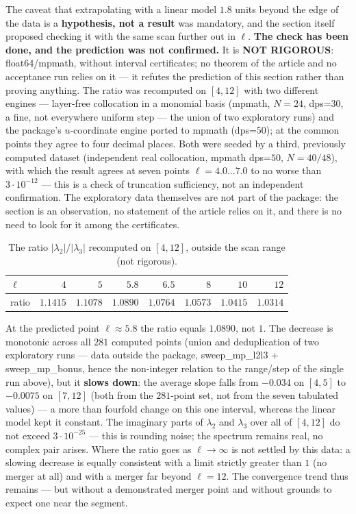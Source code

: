 The caveat that extrapolating with a linear model $1.8$ units beyond the edge
of the data is a \textbf{hypothesis, not a result} was mandatory, and the section
itself proposed checking it with the same scan further out in $\ell$. \textbf{The
check has been done, and the prediction was not confirmed.} It is \textbf{NOT
RIGOROUS}: float64/mpmath, without interval certificates; no theorem of the
article and no acceptance run relies on it --- it refutes the prediction of
this section rather than proving anything. The ratio was recomputed on
$[4,12]$ with two different engines --- layer-free collocation in a monomial
basis (mpmath, $N=24$, dps=$30$, a fine, not everywhere uniform step --- the union
of two exploratory runs) and the package's $u$-coordinate engine ported to
mpmath (dps=$50$); at the common points they agree to four decimal places.
Both were seeded by a third, previously computed dataset (independent real
collocation, mpmath dps=$50$, $N=40/48$), with which the result agrees at seven
points $\ell = 4.0 \dots 7.0$ to no worse than $3\cdot 10^{-12}$ --- this is a check of
truncation sufficiency, not an independent confirmation. The exploratory
data themselves are not part of the package: the section is an observation,
no statement of the article relies on it, and there is no need to look for
it among the certificates.

\begin{table}[ht]
\centering
\caption{The ratio $|\lambda_{2}|/|\lambda_{3}|$ recomputed on $[4,12]$, outside the scan range (not rigorous).}
\label{tab:ratio-extended}
\begin{tabular}{lrrrrrrr}
\toprule
$\ell$ & $4$ & $5$ & $5.8$ & $6.5$ & $8$ & $10$ & $12$ \\
\midrule
ratio & $1.1415$ & $1.1078$ & $1.0890$ & $1.0764$ & $1.0573$ & $1.0415$ & $1.0314$ \\
\bottomrule
\end{tabular}
\end{table}

At the predicted point $\ell \approx 5.8$ the ratio equals $1.0890$, not $1$. The decrease
is monotonic across all $281$ computed points (union and deduplication of two
exploratory runs --- data outside the package, sweep\_mp\_l2l3 +
sweep\_mp\_bonus, hence the non-integer relation to the range/step of the
single run above), but it \textbf{slows down}: the average slope falls from
$-0.034$ on $[4,5]$ to $-0.0075$ on $[7,12]$ (both from the $281$-point set, not
from the seven tabulated values) --- a more than fourfold change on this one
interval, whereas the linear model kept it constant. The imaginary parts of
$\lambda_{2}$ and $\lambda_{3}$ over all of $[4,12]$ do not exceed $3\cdot 10^{-25}$ --- this is rounding
noise; the spectrum remains real, no complex pair arises. Where the ratio
goes as $\ell \to \infty$ is not settled by this data: a slowing decrease is equally
consistent with a limit strictly greater than $1$ (no merger at all) and with
a merger far beyond $\ell = 12$. The convergence trend thus remains --- but
without a demonstrated merger point and without grounds to expect one near
the segment.

